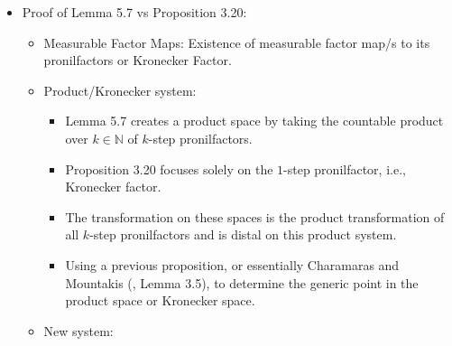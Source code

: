 \documentclass[
  british,
]{article}
\providecommand{\tightlist}{%
  \setlength{\itemsep}{0pt}\setlength{\parskip}{0pt}}
\theoremstyle{plain}
\theoremstyle{remark}
\newcommand{\Folner}[1][\vphantom{}]{{\Phi}_{#1}}
\newcommand{\Measure}{{\mu}}
\begin{document}
\begin{itemize}
  \begin{itemize}
  \tightlist
  \item
    Both start with an ergodic system.
  \item
    Instead of \(a\in\text{gen}(\Measure,\Folner)\), \(a\) is a
    transitive point (admits dense orbit).
  \item
    The systems shown to exist:

    \begin{itemize}
    \tightlist
    \item
      Both be ergodic systems with Folner sequences with a generic point
      and a continuous factor map such that \(a\) maps to this generic
      point.
    \item
      Have topological pronilfactors in Lemma 5.7, instead of a
      continuous factor map to its Kronecker factor.
    \end{itemize}
  \item
    Lemma 5.7 also states the original ergodic system and the existing
    system are measure theoretically isomorphic systems.

    \begin{itemize}
    \tightlist
    \item
      Proposition 3.20 states this within its proof
    \end{itemize}
  \end{itemize}
\item
  Proof of Lemma 5.7 vs Proposition 3.20:

  \begin{itemize}
  \tightlist
  \item
    Measurable Factor Maps: Existence of measurable factor map/s to its
    pronilfactors or Kronecker Factor.
  \item
    Product/Kronecker system:

    \begin{itemize}
    \tightlist
    \item
      Lemma 5.7 creates a product space by taking the countable product
      over \(k\in\mathbb{N}\) of \(k\)-step pronilfactors.
    \item
      Proposition 3.20 focuses solely on the \(1\)-step pronilfactor,
      i.e., Kronecker factor.
    \item
      The transformation on these spaces is the product transformation
      of all \(k\)-step pronilfactors and is distal on this product
      system.
    \item
      Using a previous proposition, or essentially Charamaras and
      Mountakis
      (,
      Lemma 3.5), to determine the generic point in the product space or
      Kronecker space.
    \end{itemize}
  \item
    New system:


\end{itemize}
\end{itemize}
\end{document}
